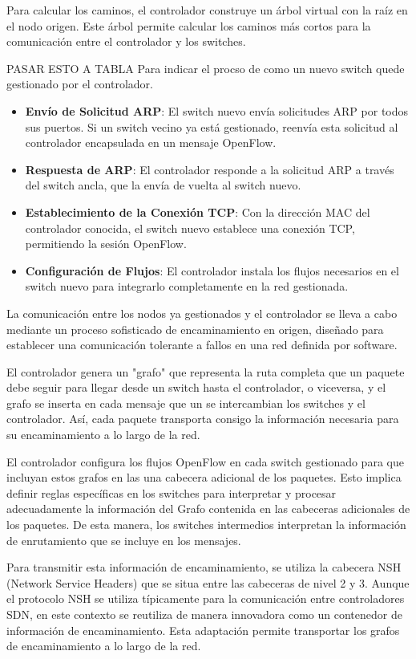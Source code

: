 \documentclass[a4paper, 12pt]{book}
\begin{document}
	Para calcular los caminos, el controlador construye un árbol virtual con la raíz en el nodo origen. Este árbol permite calcular los caminos más cortos para la comunicación entre el controlador y los switches.

	
	PASAR ESTO A TABLA Para indicar el procso de como un nuevo switch quede gestionado por el controlador.
	\begin{itemize}
		\item \textbf{Envío de Solicitud ARP}: El switch nuevo envía solicitudes ARP por todos sus puertos. Si un switch vecino ya está gestionado, reenvía esta solicitud al controlador encapsulada en un mensaje OpenFlow.
		\item \textbf{Respuesta de ARP}: El controlador responde a la solicitud ARP a través del switch ancla, que la envía de vuelta al switch nuevo.
		\item \textbf{Establecimiento de la Conexión TCP}: Con la dirección MAC del controlador conocida, el switch nuevo establece una conexión TCP, permitiendo la sesión OpenFlow.
		\item \textbf{Configuración de Flujos}: El controlador instala los flujos necesarios en el switch nuevo para integrarlo completamente en la red gestionada.
	\end{itemize}
		
	La comunicación entre los nodos ya gestionados y el controlador se lleva a cabo mediante un proceso sofisticado de encaminamiento en origen, diseñado para establecer una comunicación tolerante a fallos en una red definida por software. 
	
	El controlador genera un "grafo" que representa la ruta completa que un paquete debe seguir para llegar desde un switch hasta el controlador, o viceversa, y el grafo se inserta en cada mensaje que un se intercambian los switches y el controlador. Así, cada paquete transporta consigo la información necesaria para su encaminamiento a lo largo de la red.
	
	El controlador configura los flujos OpenFlow en cada switch gestionado para que incluyan estos grafos en las una cabecera adicional de los paquetes. Esto implica definir reglas específicas en los switches para interpretar y procesar adecuadamente la información del Grafo contenida en las cabeceras adicionales de los paquetes. De esta manera, los switches intermedios interpretan la información de enrutamiento que se incluye en los mensajes.
	
	Para transmitir esta información de encaminamiento, se utiliza la cabecera NSH (Network Service Headers) que se situa entre las cabeceras de nivel 2 y 3. Aunque el protocolo NSH se utiliza típicamente para la comunicación entre controladores SDN, en este contexto se reutiliza de manera innovadora como un contenedor de información de encaminamiento. Esta adaptación permite transportar los grafos de encaminamiento a lo largo de la red.
	
\end{document}
